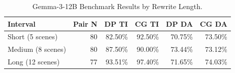 \begin{table}[htbp]
\centering
\caption{Gemma-3-12B Benchmark Results by Rewrite Length.}
\label{tab:table9_primary_by_length}
\begin{tabular}{lrrrrr}
\toprule
Interval & Pair N & DP TI & CG TI & DP DA & CG DA \\
\midrule
Short (5 scenes) & 80 & 82.50\% & 92.50\% & 70.75\% & 73.50\% \\
Medium (8 scenes) & 80 & 87.50\% & 90.00\% & 73.44\% & 73.12\% \\
Long (12 scenes) & 77 & 93.51\% & 97.40\% & 71.65\% & 74.03\% \\
\bottomrule
\end{tabular}
\end{table}
